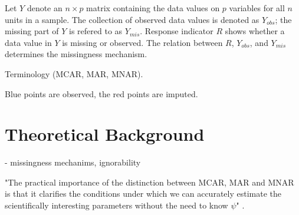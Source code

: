 \documentclass[article]{jss}
\begin{document}
Let $Y$ denote an $n \times p$ matrix containing the data values on $p$ variables for all $n$ units in a sample. The collection of observed data values is denoted as $Y_{obs}$; the missing part of $Y$ is refered to as $Y_{mis}$. Response indicator $R$ shows whether a data value in $Y$ is missing or observed. The relation between $R$, $Y_{obs}$, and $Y_{mis}$ determines the missingness mechanism.




Terminology (MCAR, MAR, MNAR). 

Blue points are observed, the red points are imputed. 

\section{Theoretical Background} \label{sec:background}

- missingness mechanims, ignorability

"The practical importance of the distinction between MCAR, MAR and MNAR is that it clarifies the conditions under which we can accurately estimate the scientifically interesting parameters without the need to know $\psi$" \cite[par.~2.2]{buur18}.
\end{document}
